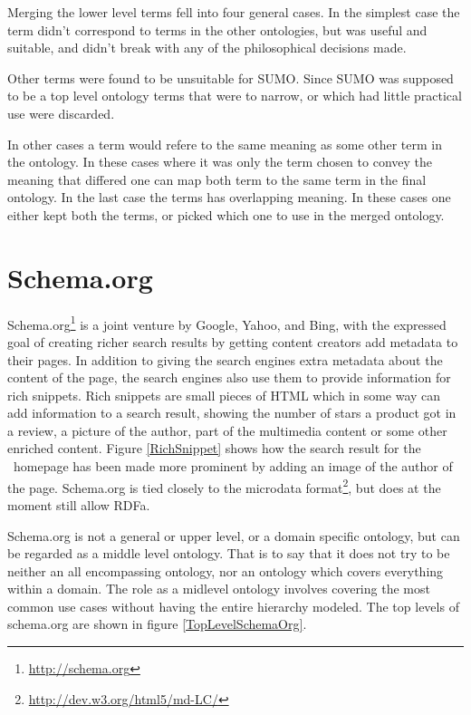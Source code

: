 Merging the lower level terms fell into four general cases.
In the simplest case the term didn't correspond to terms in the other ontologies,
but was useful and suitable, and didn't break with any of the philosophical decisions made.

Other terms were found to be unsuitable for SUMO.
Since SUMO was supposed to be a top level ontology terms that were to narrow,
or which had little practical use were discarded.

In other cases a term would refere to the same meaning as some other term in the ontology.
In these cases where it was only the term chosen to convey the meaning that differed one can map both term to the same
term in the final ontology.
In the last case the terms has overlapping meaning.
In these cases one either kept both the terms, or picked which one to use in the merged ontology.


\section{Schema.org}
\label{schemadotorg}
Schema.org\footnote{\url{http://schema.org}} is a joint venture by Google, Yahoo, and Bing,
with the expressed goal of creating richer search results by getting content creators add metadata to their pages.
In addition to giving the search engines extra metadata about the content of the page,
the search engines also use them to provide information for rich snippets\citep{Guha2011}.
Rich snippets are small pieces of HTML which in some way can add information to a search result,
showing the number of stars a product got in a review, a picture of the author, part of the multimedia content
or some other enriched content\citep{Mayer2009}.
Figure \ref{RichSnippet} shows how the search result for the \theartefact\ homepage has been made more prominent by adding
an image of the author of the page.
Schema.org is tied closely to the microdata format\footnote{\url{http://dev.w3.org/html5/md-LC/}},
but does at the moment still allow RDFa.

Schema.org is not a general or upper level, or a domain specific ontology,
but can be regarded as a middle level ontology.
That is to say that it does not try to be neither an all encompassing ontology,
nor an ontology which covers everything within a domain.
The role as a midlevel ontology involves covering the most common use cases without having the entire hierarchy modeled.
The top levels of schema.org are shown in figure \ref{TopLevelSchemaOrg}.

